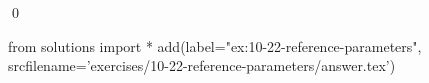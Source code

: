 
\begin{ex}
  \label{ex:10-22-reference-parameters}
  
  \qed
\end{ex}
\begin{python0}
from solutions import *
add(label="ex:10-22-reference-parameters",
    srcfilename='exercises/10-22-reference-parameters/answer.tex')
\end{python0}
